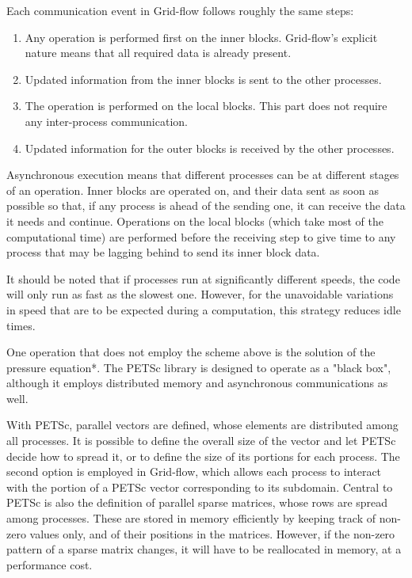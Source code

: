 \documentclass[11pt, a4paper, oneside, openany]{book}
\begin{document}
Each communication event in Grid-flow follows roughly the same steps:
\begin{enumerate}
	\item Any operation is performed first on the inner blocks. Grid-flow's explicit nature means that all required data is already present.
	\item Updated information from the inner blocks is sent to the other processes.
	\item The operation is performed on the local blocks. This part does not require any inter-process communication.
	\item Updated information for the outer blocks is received by the other processes. 
\end{enumerate}
Asynchronous execution means that different processes can be at different stages of an operation. Inner blocks are operated on, and their data sent as soon as possible so that, if any process is ahead of the sending one, it can receive the data it needs and continue. Operations on the local blocks (which take most of the computational time) are performed before the receiving step to give time to any process that may be lagging behind to send its inner block data.\par
It should be noted that if processes run at significantly different speeds, the code will only run as fast as the slowest one. However, for the unavoidable variations in speed that are to be expected during a computation, this strategy reduces idle times.\par
One operation that does not employ the scheme above is the solution of the pressure equation*. The PETSc library is designed to operate as a "black box", although it employs distributed memory and asynchronous communications as well.\par
With PETSc, parallel vectors are defined, whose elements are distributed among all processes. It is possible to define the overall size of the vector and let PETSc decide how to spread it, or to define the size of its portions for each process. The second option is employed in Grid-flow, which allows each process to interact with the portion of a PETSc vector corresponding to its subdomain. 
Central to PETSc is also the definition of parallel sparse matrices, whose rows are spread among processes. These are stored in memory efficiently by keeping track of non-zero values only, and of their positions in the matrices. However, if the non-zero pattern of a sparse matrix changes, it will have to be reallocated in memory, at a performance cost. 
\end{document}
